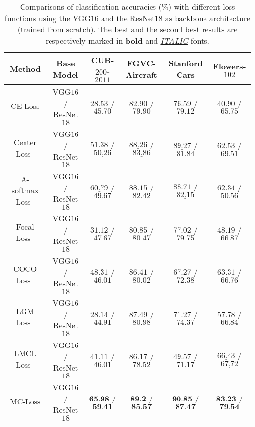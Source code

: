 \documentclass[journal]{IEEEtran}
\begin{document}
\begin{table*}[!t]
  \centering
  \small
\caption{Comparisons of classification accuracies ($\%$) with different loss functions using the VGG$16$ and the ResNet$18$ as backbone architecture (trained from scratch). The best and the second best results are respectively marked in \textbf{bold} and \underline{\emph{ITALIC}} fonts.}
    \begin{tabular}{|c|c|c|c|c|c|}
    \hline
    Method                                   & Base Model                                 & CUB-$200$-$2011$                        & FGVC-Aircraft                                                & Stanford Cars                             & Flowers-$102$ \\
    \hline
    \hline
    CE Loss                                  & VGG$16$ / ResNet$18$                       & $28.53$ / $45.70$                       & $82.90$ / $79.90$                                            & $76.59$ / $79.12$                         & $40.90$ / $65.75$  \\
    Center Loss~\cite{wen2016discriminative} & VGG$16$ / ResNet$18$                       & $51.38$ / $\underline{\textit{50.26}}$  & $\underline{\textit{88.26}}$ / $\underline{\textit{83.86}}$  & $\underline{\textit{89.27}}$ / $81.84$    & $62.53$ / $69.51$  \\
    A-softmax Loss~\cite{liu2017sphereface}  & VGG$16$ / ResNet$18$                       & $\underline{\textit{60.79}}$ / $49.67$  & $88.15$ / $82.42$                                            & $88.71$ / $\underline{\textit{82.15}}$    & $62.34$ / $50.56 $ \\
    Focal Loss~\cite{lin2017focal}           & VGG$16$ / ResNet$18$                       & $31.12$ / $47.67$                       & $80.85$ / $80.47$                                            & $77.02$ / $79.75$                         & $48.19$ / $66.87$  \\
    COCO Loss~\cite{liu2017rethinking}       & VGG$16$ / ResNet$18$                       & $48.31$ / $46.01$                       & $86.41$ / $80.02$                                            & $67.27$ / $72.38$                         & $63.31$ / $66.76$ \\
    LGM Loss~\cite{wan2018rethinking}        & VGG$16$ / ResNet$18$                       & $28.14$ / $44.91$                       & $87.49$ / $80.98$                                            & $71.27$ / $74.37$                         & $57.78$ / $66.84$  \\
    LMCL Loss~\cite{wang2018cosface}              & VGG$16$ / ResNet$18$                       & $41.11$ / $46.01$                       & $86.17$ / $78.52$                                            & $49.57$ / $71.17$                         & $\underline{\textit{66.43}}$ / $\underline{\textit{67.72}}$ \\
    \hline
    \hline
    MC-Loss                                  & VGG$16$ / ResNet$18$                       & $\textbf{65.98}$ / $\textbf{59.41}$     & $\textbf{89.2}$ / $\textbf{85.57}$                            & $\textbf{90.85}$  / $\textbf{87.47}$     & $\textbf{83.23}$ / $\textbf{79.54}$ \\
    \hline
    

\end{tabular}
\end{table*}
\end{document}

